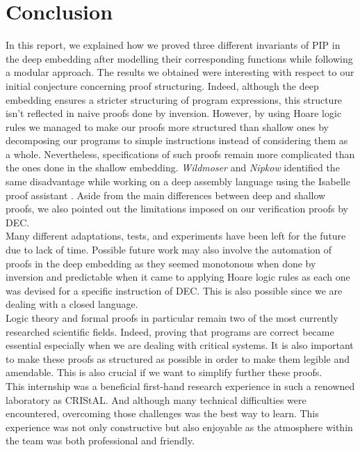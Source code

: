 \chapter{Conclusion}
In this report, we explained how we proved three different invariants of PIP in the deep embedding after modelling their corresponding functions while following a modular approach. The results we obtained were interesting with respect to our initial conjecture concerning proof structuring. Indeed, although the deep embedding ensures a stricter structuring of program expressions, this structure isn't reflected in naive proofs done by inversion. However, by using Hoare logic rules we managed to make our proofs more structured than shallow ones by decomposing our programs to simple instructions instead of considering them as a whole. Nevertheless, specifications of such proofs remain more complicated than the ones done in the shallow embedding. \textit{Wildmoser} and \textit{Nipkow} identified the same disadvantage while working on a deep assembly language using the Isabelle proof assistant \cite{Wildmoser}. Aside from the main differences between deep and shallow proofs, we also pointed out the limitations imposed on our verification proofs by DEC. \\

Many different adaptations, tests, and experiments have been left for the future due to lack of time. Possible future work may also involve the automation of proofs in the deep embedding as they seemed monotonous when done by inversion and predictable when it came to applying Hoare logic rules as each one was devised for a specific instruction of DEC. This is also possible since we are dealing with a closed language. \\

Logic theory and formal proofs in particular remain two of the most currently researched scientific fields. Indeed, proving that programs are correct became essential especially when we are dealing with critical systems. It is also important to make these proofs as structured as possible in order to make them legible and amendable. This is also crucial if we want to simplify further these proofs.  \\   

This internship was a beneficial first-hand research experience in such a renowned laboratory as CRIStAL. And although many technical difficulties were encountered, overcoming those challenges was the best way to learn. This experience was not only  constructive but also enjoyable as the atmosphere within the team was both professional and friendly. \\ 
